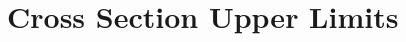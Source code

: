 \cleartooddpage[\thispagestyle{empty}]
\renewcommand{\thechapter}{\thechapter}
\renewcommand{\thesection}{\thechapter.\arabic{section}}
\renewcommand{\thesubsection}{\thechapter.\arabic{section}.\arabic{subsection}}
\renewcommand{\thesubsubsection}{\thechapter.\arabic{section}.\arabic{subsection}.\arabic{subsubsection}}
\renewcommand{\thefigure}{\thechapter.\arabic{figure}}
\renewcommand{\thetable}{\thechapter.\arabic{table}}
\renewcommand{\theequation}{\thechapter.\arabic{equation}}
\appendix

\chapter{Cross Section Upper Limits}






